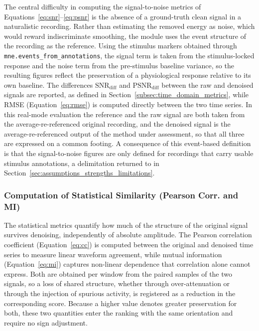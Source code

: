 \documentclass[MScCS,12pt,oneside,final]{uccthesis}
\begin{document}
The central difficulty in computing the signal-to-noise metrics of Equations~\ref{eq:snr}--\ref{eq:psnr} is the absence of a ground-truth clean signal in a naturalistic recording. Rather than estimating the removed energy as noise, which would reward indiscriminate smoothing, the module uses the event structure of the recording as the reference. Using the stimulus markers obtained through \texttt{mne.events\_from\_annotations}, the signal term is taken from the stimulus-locked response and the noise term from the pre-stimulus baseline variance, so the resulting figures reflect the preservation of a physiological response relative to its own baseline. The differences $\mathrm{SNR}_{\mathrm{diff}}$ and $\mathrm{PSNR}_{\mathrm{diff}}$ between the raw and denoised signals are reported, as defined in Section~\ref{subsec:time_domain_metrics}, while RMSE (Equation~\ref{eq:rmse}) is computed directly between the two time series. In this real-mode evaluation the reference and the raw signal are both taken from the average-re-referenced original recording, and the denoised signal is the average-re-referenced output of the method under assessment, so that all three are expressed on a common footing. A consequence of this event-based definition is that the signal-to-noise figures are only defined for recordings that carry usable stimulus annotations, a delimitation returned to in Section~\ref{sec:assumptions_strengths_limitations}.

\subsubsection{Computation of Statistical Similarity (Pearson Corr. and MI)}
\label{subsubsec:computation_statistical}
 
The statistical metrics quantify how much of the structure of the original signal survives denoising, independently of absolute amplitude. The Pearson correlation coefficient (Equation~\ref{eq:cc}) is computed between the original and denoised time series to measure linear waveform agreement, while mutual information (Equation~\ref{eq:mi}) captures non-linear dependence that correlation alone cannot express. Both are obtained per window from the paired samples of the two signals, so a loss of shared structure, whether through over-attenuation or through the injection of spurious activity, is registered as a reduction in the corresponding score. Because a higher value denotes greater preservation for both, these two quantities enter the ranking with the same orientation and require no sign adjustment.
\end{document}
